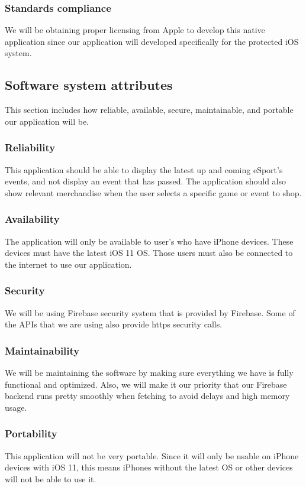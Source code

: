 \documentclass[onecolumn, draftclsnofoot,10pt, compsoc]{IEEEtran}
\begin{document}
\subsubsection{Standards compliance}
  We will be obtaining proper licensing from Apple to develop this native application since our application will developed specifically for the protected iOS system.


\subsection{Software system attributes}
This section includes how reliable, available, secure, maintainable, and portable our application will be.

\subsubsection{Reliability}
This application should be able to display the latest up and coming eSport's events, and not display an event that has passed. The application should also show relevant merchandise when the user selects a specific game or event to shop.

\subsubsection{Availability}
The application will only be available to user's who have iPhone devices. These devices must have the latest iOS 11 OS. Those users must also be connected to the internet to use our application.

\subsubsection{Security}
We will be using Firebase security system that is provided by Firebase. Some of the APIs that we are using also provide https security calls.

\subsubsection{Maintainability}
We will be maintaining the software by making sure everything we have is fully functional and optimized. Also, we will make it our priority that our Firebase backend runs pretty smoothly when fetching to avoid delays and high memory usage.

\subsubsection{Portability}
This application will not be very portable. Since it will only be usable on iPhone devices with iOS 11, this means iPhones without the latest OS or other devices will not be able to use it.
\end{document}
